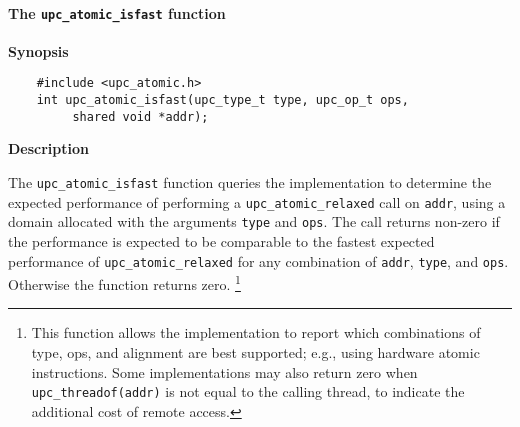 \paragraph{The {\tt upc\_atomic\_isfast} function}

{\bf Synopsis}

\npf\vspace{-1.8em}
\begin{verbatim}
    #include <upc_atomic.h>
    int upc_atomic_isfast(upc_type_t type, upc_op_t ops,
         shared void *addr);
\end{verbatim}

{\bf Description}

\np The {\tt upc\_atomic\_isfast} function queries the implementation to determine
    the expected performance of performing a {\tt upc\_atomic\_relaxed} call on
    {\tt addr}, using a domain allocated with the arguments {\tt type} and
    {\tt ops}.  The call returns non-zero if the performance is expected to be
    comparable to the fastest expected performance of {\tt upc\_atomic\_relaxed}
    for any combination of {\tt addr}, {\tt type}, and {\tt ops}.  Otherwise
    the function returns zero.%
    \footnote{This function allows the implementation to report which
    combinations of type, ops, and alignment are best supported; e.g., using
    hardware atomic instructions.  Some implementations may also return zero
    when {\tt upc\_threadof(addr)} is not equal to the calling thread, to
    indicate the additional cost of remote access.}
